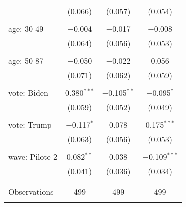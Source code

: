\begin{tabular}{@{\extracolsep{5pt}}lccc}
  & (0.066) & (0.057) & (0.054) \\ 
  & & & \\ 
 age: 30-49 & $-$0.004 & $-$0.017 & $-$0.008 \\ 
  & (0.064) & (0.056) & (0.053) \\ 
  & & & \\ 
 age: 50-87 & $-$0.050 & $-$0.022 & 0.056 \\ 
  & (0.071) & (0.062) & (0.059) \\ 
  & & & \\ 
 vote: Biden & 0.380$^{***}$ & $-$0.105$^{**}$ & $-$0.095$^{*}$ \\ 
  & (0.059) & (0.052) & (0.049) \\ 
  & & & \\ 
 vote: Trump & $-$0.117$^{*}$ & 0.078 & 0.175$^{***}$ \\ 
  & (0.063) & (0.056) & (0.053) \\ 
  & & & \\ 
 wave: Pilote 2 & 0.082$^{**}$ & 0.038 & $-$0.109$^{***}$ \\ 
  & (0.041) & (0.036) & (0.034) \\ 
  & & & \\ 
\hline \\[-1.8ex] 

Observations & 499 & 499 & 499 \\ 
\hline 
\hline \\[-1.8ex] 
\end{tabular} 